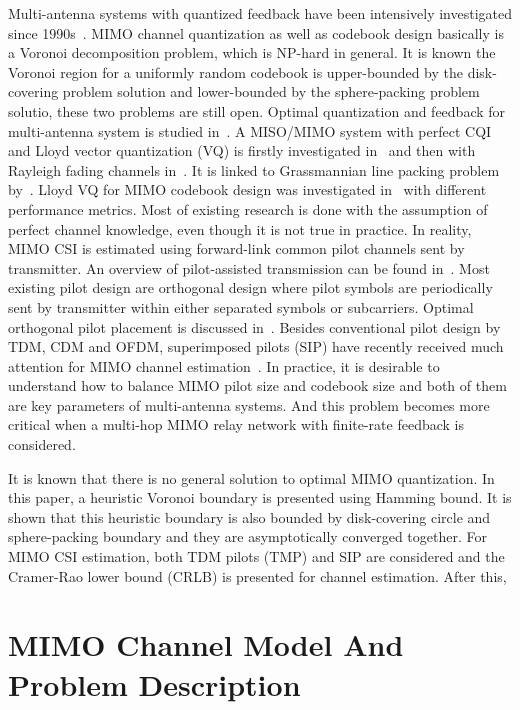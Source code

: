 \documentclass[10pt,fleqn, twocolumn]{IEEEtran}
\begin{document}
Multi-antenna systems with quantized feedback have been
intensively investigated since 1990s~\cite{Gerlach94}. MIMO
channel quantization as well as codebook design basically is a
Voronoi decomposition problem, which is NP-hard in general. It is
known the Voronoi region for a uniformly random codebook is
upper-bounded by the disk-covering problem solution and
lower-bounded by the sphere-packing problem solutio, these two
problems are still open. Optimal quantization and feedback for
multi-antenna system is studied in~\cite{Skog03,Lau04}. A
MISO/MIMO system with perfect CQI and Lloyd vector quantization
(VQ) is firstly investigated in~\cite{Narula98} and then with
Rayleigh fading channels in~\cite{Mukka03}. It is linked to
Grassmannian line packing problem by~\cite{Love02}. Lloyd VQ for
MIMO codebook design was investigated in~\cite{PXia04,Roh04} with
different performance metrics. Most of existing research is done
with the assumption of perfect channel knowledge, even though it
is not true in practice. In reality, MIMO CSI is estimated using
forward-link common pilot channels sent by transmitter. An
overview of pilot-assisted transmission can be found
in~\cite{Tong04}. Most existing pilot design are orthogonal design
where pilot symbols are periodically sent by transmitter within
either separated symbols or subcarriers. Optimal orthogonal pilot
placement is discussed in~\cite{Dong02}. Besides conventional
pilot design by TDM, CDM and OFDM, superimposed pilots (SIP) have
recently received much attention for MIMO channel
estimation~\cite{Coldrey06}. In practice, it is desirable to
understand how to balance MIMO pilot size and codebook size and
both of them are key parameters of multi-antenna systems. And this
problem becomes more critical when a multi-hop MIMO relay network
with finite-rate feedback is considered.

It is known that there is no general solution to optimal MIMO
quantization. In this paper, a heuristic Voronoi boundary is
presented using Hamming bound. It is shown that this heuristic
boundary is also bounded by disk-covering circle and
sphere-packing boundary and they are asymptotically converged
together. For MIMO CSI estimation, both TDM pilots (TMP) and SIP
are considered and the Cramer-Rao lower bound (CRLB) is presented
for channel estimation. After this,

\section{MIMO Channel Model And Problem Description\label{MIMO_system_model}}
\end{document}
